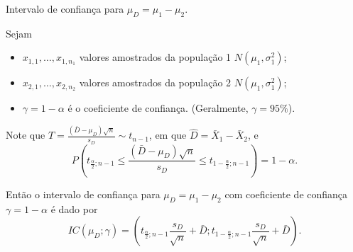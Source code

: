 \documentclass[9pt]{beamer}
\begin{document}
\begin{frame}{Intervalo de confiança para $\mu_D = \mu_1 - \mu_2$.}

\normalsize

Sejam
\begin{itemize}
	\item $x_{1,1}, \dots, x_{1,n_1}$ valores amostrados da população 1 $N(\mu_1, \sigma_1^2)$;
	\item $x_{2,1}, \dots, x_{2,n_2}$ valores amostrados da população 2 $N(\mu_1, \sigma_1^2)$;
	\item $\gamma=1-\alpha$ é o coeficiente de confiança. (Geralmente, $\gamma=95\%$).
\end{itemize}
\vfill

Note que $T = \frac{(\bar{D} -\mu_D)\sqrt{n} }{s_D} \sim t_{n-1}$, em que $\hat{D} = \bar{X}_1 - \bar{X}_2$, e 
$$P\left( t_{\frac{\alpha}{2}; n-1} \leq \frac{(\bar{D} -\mu_D) \sqrt{n} }{s_D} \leq t_{1-\frac{\alpha}{2}; n-1} \right) = 1 - \alpha.$$
\vfill

Então o intervalo de confiança para $\mu_D = \mu_1 - \mu_2$ com coeficiente de confiança $\gamma=1-\alpha$ é dado por
$$IC\left(\mu_D; \gamma\right) = \left( t_{\frac{\alpha}{2}; n-1} \frac{s_D}{\sqrt{n}} + \bar{D}; t_{1-\frac{\alpha}{2}; n-1} \frac{s_D}{\sqrt{n}} + \bar{D} \right).$$


\normalsize
\end{frame}
\end{document}
